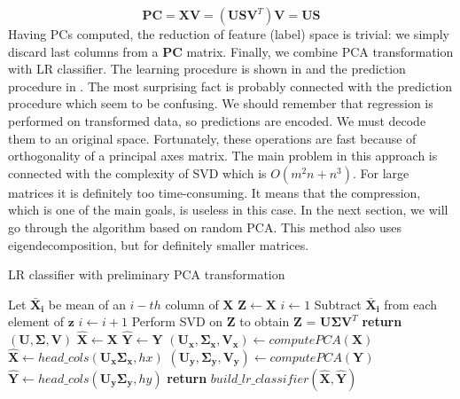 \begin{equation}\label{eq:pca4}
    \boldsymbol{PC} = \boldsymbol{X}\boldsymbol{V} = (\boldsymbol{U}\boldsymbol{S}\boldsymbol{V}^{T})\boldsymbol{V} = \boldsymbol{U}\boldsymbol{S}
\end{equation}
Having PCs computed, the reduction of feature (label) space is trivial: we simply discard last columns from a $\boldsymbol{PC}$ matrix.  
Finally, we combine PCA transformation with LR classifier. The learning procedure is shown in  and the prediction procedure in . The most surprising fact is probably connected with the prediction procedure which seem to be confusing. We should remember that regression is performed on transformed data, so predictions are encoded. We must decode them to an original space. Fortunately, these operations are fast because of orthogonality of a principal axes matrix. The main problem in this approach is connected with the complexity of SVD which is $O(m^2n+n^3)$. For large matrices it is definitely too time-consuming. It means that the compression, which is one of the main goals, is useless in this case. In the next section, we will go through the algorithm based on random PCA. This method also uses eigendecomposition, but for definitely smaller matrices.

\begin{algorithm}
    \caption{LR classifier with preliminary PCA transformation}\label{alg:pca1}
    \begin{algorithmic}[1]
    
        \State Let $\boldsymbol{\bar{X}_i}$ be mean of an $i-th$ column of $\boldsymbol{X}$
        \State $\boldsymbol{Z} \gets \boldsymbol{X}$
        \State $i \gets 1$
            \State Subtract $\boldsymbol{\bar{X}_i}$ from each element of $\boldsymbol{z}$ 
            \State $i \gets i+1$ 
        \EndFor
        \State Perform SVD on $\boldsymbol{Z}$ to obtain $\boldsymbol{Z}$ = $\boldsymbol{U}\boldsymbol{\Sigma}\boldsymbol{V}^T$
        \State \textbf{return} $(\boldsymbol{U}, \boldsymbol{\Sigma}, \boldsymbol{V})$
    \EndFunction
    \State
        \State $\boldsymbol{\hat{X}} \gets \boldsymbol{X}$ 
        \State $\boldsymbol{\hat{Y}} \gets \boldsymbol{Y}$ 
            \State $(\boldsymbol{U_x}, \boldsymbol{\Sigma_{x}}, \boldsymbol{V_x}) \gets  computePCA(\boldsymbol{X})$
            \State $\boldsymbol{\hat{X}} \gets head\_cols(\boldsymbol{U_x\Sigma_{x}}, hx)$
        \EndIf
            \State $(\boldsymbol{U_y}, \boldsymbol{\Sigma_{y}}, \boldsymbol{V_y}) \gets computePCA(\boldsymbol{Y})$
            \State $\boldsymbol{\hat{Y}} \gets head\_cols(\boldsymbol{U_y\Sigma_{y}}, hy)$
        \EndIf
        \State \textbf{return} $build\_lr\_classifier(\boldsymbol{\hat{X}}, \boldsymbol{\hat{Y}})$ 
    \EndFunction
    \end{algorithmic}
\end{algorithm}

